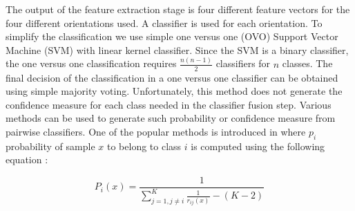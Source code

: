 \documentclass[conference]{IEEEtran}
\begin{document}
The output of the feature extraction stage is four different feature vectors for the four different orientations used. A classifier is used for each orientation. To simplify the classification we use simple one versus one (OVO) Support Vector Machine (SVM) with linear kernel classifier. Since the SVM is a binary classifier, the one versus one classification requires $\frac{n(n-1)}{2}$ classifiers for $n$ classes. The final decision of the classification in a one versus one classifier can be obtained using simple majority voting. Unfortunately, this method does not generate the confidence measure for each class needed in the classifier fusion step. Various methods can be used to generate such probability or confidence measure from pairwise classifiers. One of the popular methods is introduced in \cite{pairwise22} where $p_i$ probability of sample $x$ to belong to class $i$  is computed using the following equation :

%
\[
P_i(x)  = \frac{1}{{\sum\limits_{j = 1,j \ne i}^K {\frac{1}{{r_{ij}(x) }} - (K - 2)} }}
\]
\end{document}
